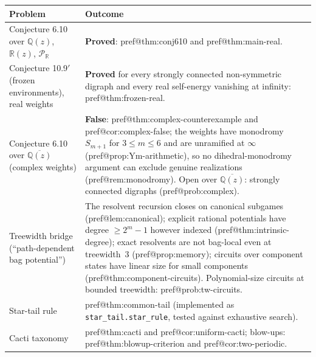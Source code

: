 \documentclass[11pt]{amsart}
\makeatletter
\newcommand{\pref}[1]{\csname pref@#1\endcsname}
\newcommand{\Qz}{\mathbb{Q}(z)}
\newcommand{\Rz}{\mathbb{R}(z)}
\newcommand{\Qzbar}{\overline{\mathbb{Q}(z)}}
\newcommand{\Puis}{\mathcal{P}_{\mathbb{R}}}
\makeatother
\begin{document}
\begin{center}\small
\begin{longtable}{@{}p{5.2cm}p{9.3cm}@{}}
\toprule
Problem & Outcome\\ \midrule\endhead
Conjecture 6.10 over $\Qz$, $\Rz$, $\Puis$ & \textbf{Proved}: \pref{thm:conj610} and \pref{thm:main-real}.\\
Conjecture 10.9$'$ (frozen environments), real weights & \textbf{Proved} for every strongly connected non-symmetric digraph and every real self-energy vanishing at infinity: \pref{thm:frozen-real}.\\
Conjecture 6.10 over $\Qzbar$ (complex weights) & \textbf{False}: \pref{thm:complex-counterexample} and \pref{cor:complex-false}; the weights have monodromy $S_{m+1}$ for $3\le m\le6$ and are unramified at $\infty$ (\pref{prop:Ym-arithmetic}), so no dihedral-monodromy argument can exclude genuine realizations (\pref{rem:monodromy}). Open over $\Qzbar$: strongly connected digraphs (\pref{prob:complex}).\\
Treewidth bridge (``path-dependent bag potential'') & The resolvent recursion closes on canonical subgames (\pref{lem:canonical}); explicit rational potentials have degree $\ge2^{m}-1$ however indexed (\pref{thm:intrinsic-degree}); exact resolvents are not bag-local even at treewidth~$3$ (\pref{prop:memory}); circuits over component states have linear size for small components (\pref{thm:component-circuits}). Polynomial-size circuits at bounded treewidth: \pref{prob:tw-circuits}.\\
Star-tail rule & \pref{thm:common-tail} (implemented as \texttt{star\_tail.star\_rule}, tested against exhaustive search).\\
Cacti taxonomy & \pref{thm:cacti} and \pref{cor:uniform-cacti}; blow-ups: \pref{thm:blowup-criterion} and \pref{cor:two-periodic}.\\
\bottomrule
\end{longtable}
\end{center}
\end{document}
